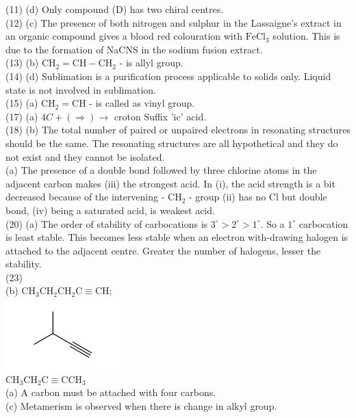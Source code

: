 \documentclass[10pt]{article}
\begin{document}
(11) (d) Only compound (D) has two chiral centres.\\
(12) (c) The presence of both nitrogen and sulphur in the Lassaigne's extract in an organic compound gives a blood red colouration with $\mathrm{FeCl}_{3}$ solution. This is due to the formation of NaCNS in the sodium fusion extract.\\
(13) (b) $\mathrm{CH}_{2}=\mathrm{CH}-\mathrm{CH}_{2}$ - is allyl group.\\
(14) (d) Sublimation is a purification process applicable to solids only. Liquid state is not involved in sublimation.\\
(15) (a) $\mathrm{CH}_{2}=\mathrm{CH}$ - is called as vinyl group.\\
(17) (a) $4 C+(\Rightarrow) \rightarrow$ croton Suffix 'ic' acid.\\
(18) (b) The total number of paired or unpaired electrons in resonating structures should be the same. The resonating structures are all hypothetical and they do not exist and they cannot be isolated.\\
(a) The presence of a double bond followed by three chlorine atoms in the adjacent carbon makes (iii) the strongest acid. In (i), the acid strength is a bit decreased because of the intervening - $\mathrm{CH}_{2}$ - group (ii) has no Cl but double bond, (iv) being a saturated acid, is weakest acid.\\
(20) (a) The order of stability of carbocations is $3^{\circ}>2^{\circ}>1^{\circ}$. So a $1^{\circ}$ carbocation is least stable. This becomes less stable when an electron with-drawing halogen is attached to the adjacent centre. Greater the number of halogens, lesser the stability.\\
(23)\\
(b) $\mathrm{CH}_{3} \mathrm{CH}_{2} \mathrm{CH}_{2} \mathrm{C} \equiv \mathrm{CH}$;\\
\includegraphics{smile-c6f6303f206739bf0b8d2d4f0d9bfe61cba2b2a6}\\
$\mathrm{CH}_{3} \mathrm{CH}_{2} \mathrm{C} \equiv \mathrm{CCH}_{3}$\\
(a) A carbon must be attached with four carbons.\\
(c) Metamerism is observed when there is change in alkyl group.\\
\end{document}
